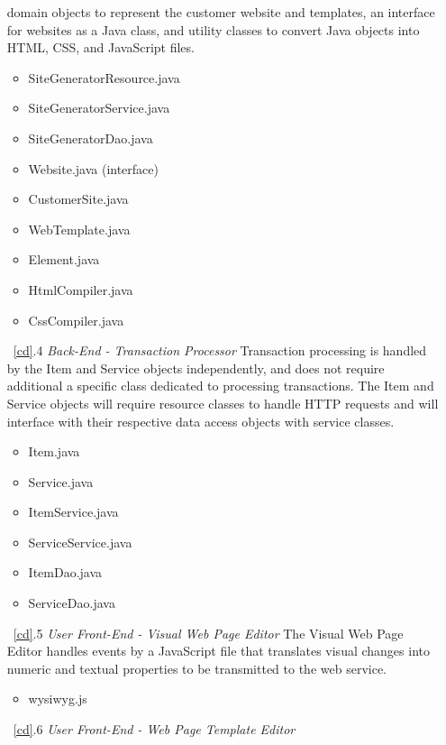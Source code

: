 \documentclass{article}
\begin{document}
\begin{enumerate}
        domain objects to represent the customer website and templates, an interface
        for websites as a Java class, and utility classes to convert Java objects
        into HTML, CSS, and JavaScript files.
        \begin{itemize}
            \item SiteGeneratorResource.java
            \item SiteGeneratorService.java
            \item SiteGeneratorDao.java
            \item Website.java (interface)
            \item CustomerSite.java
            \item WebTemplate.java
            \item Element.java
            \item HtmlCompiler.java
            \item CssCompiler.java
        \end{itemize}
    \item[~\ref{cd}.4 ] \emph{Back-End - Transaction Processor}
        Transaction processing is handled by the Item and Service objects
        independently, and does not require additional a specific class dedicated
        to processing transactions.  The Item and Service objects will require
        resource classes to handle HTTP requests and will interface with their
        respective data access objects with service classes.
        \begin{itemize}
            \item Item.java
            \item Service.java
            \item ItemService.java
            \item ServiceService.java
            \item ItemDao.java
            \item ServiceDao.java
        \end{itemize}
    \item[~\ref{cd}.5 ] \emph{User Front-End - Visual Web Page Editor}
        The Visual Web Page Editor handles events by a JavaScript file that
        translates visual changes into numeric and textual properties to be
        transmitted to the web service.
        \begin{itemize}
            \item wysiwyg.js
        \end{itemize}
    \item[~\ref{cd}.6 ] \emph{User Front-End - Web Page Template Editor}

\end{enumerate}
\end{document}

